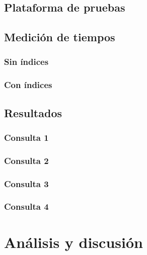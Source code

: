 \subsection{Plataforma de pruebas}

\subsection{Medición de tiempos}
\subsubsection{Sin índices}
\subsubsection{Con índices}

\subsection{Resultados}
\subsubsection{Consulta 1}
\subsubsection{Consulta 2}
\subsubsection{Consulta 3}
\subsubsection{Consulta 4}

\section{Análisis y discusión}